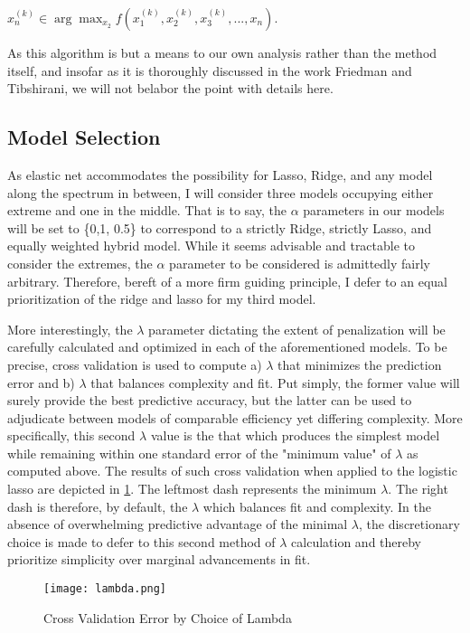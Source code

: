 \documentclass[11pt]{article}
\begin{document}
 \begin{center}
 $x_n^{(k)} \in \arg\max_{x_2} f(x_1^{(k)},x_2^{(k)},x_3^{(k)},...,x_n)$.
 \end{center}

As this algorithm is but a means to our own analysis rather than the method itself, and insofar as it is thoroughly discussed in the work Friedman and Tibshirani, we will not belabor the point with details here.  


\subsection{Model Selection}

	As elastic net accommodates the possibility for Lasso, Ridge, and any model along the spectrum in between, I will consider three models occupying either extreme and one in the middle.  That is to say, the $\alpha$ parameters in our models will be set to \{0,1, 0.5\} to correspond to a strictly Ridge, strictly Lasso, and equally weighted hybrid model.  While it seems advisable and tractable to consider the extremes, the $\alpha$ parameter to be considered is admittedly fairly arbitrary.  Therefore, bereft of a more firm guiding principle, I defer to an equal prioritization of the ridge and lasso for my third model.  
	
	More interestingly, the $\lambda$ parameter dictating the extent of penalization will be carefully calculated and optimized in each of the aforementioned models.  To be precise, cross validation is used to compute a) $\lambda$ that minimizes the prediction error and b) $\lambda$ that balances complexity and fit.  Put simply, the former value will surely provide the best predictive accuracy, but the latter can be used to adjudicate between models of comparable efficiency yet differing complexity.  More specifically, this second $\lambda$ value is the that which produces the simplest model while remaining within one standard error of the "minimum value" of $\lambda$ as computed above.  The results of such cross validation when applied to the logistic lasso are depicted in \ref{fig:lam}.  The leftmost dash represents the minimum $\lambda$.  The right dash is therefore, by default, the $\lambda$ which balances fit and complexity.  In the absence of overwhelming predictive advantage of the minimal $\lambda$, the discretionary choice is made to defer to this second method of $\lambda$ calculation and thereby prioritize simplicity over marginal advancements in fit.  

\begin{figure}[htbp]
\centerline{\texttt{[image: lambda.png]}}
\caption{Cross Validation Error by Choice of Lambda}\label{fig:lam}
\end{figure}
\end{document}
